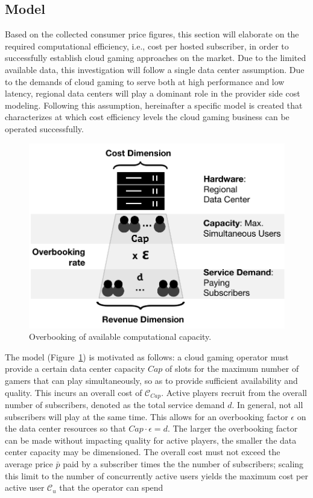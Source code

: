 \subsection{Model}

Based on the collected consumer price figures, this section will elaborate on the required computational efficiency, i.e., cost per hosted subscriber, in order to successfully establish cloud gaming approaches on the market. Due to the limited available data, this investigation will follow a single data center assumption. Due to the demands of cloud gaming to serve both at high performance and low latency, regional data centers will play a dominant role in the provider side cost modeling. Following this assumption, hereinafter a specific model is created that characterizes at which cost efficiency levels the cloud gaming business can be operated successfully.

\begin{figure}[!t]
	\centering
	\includegraphics[width=0.75\columnwidth]{images/overbooking_datacenterNG.pdf}
	\caption{Overbooking of available computational capacity.}
\label{fig:overbooking_datacenter}
\end{figure}

The model (Figure~\ref{fig:overbooking_datacenter}) is motivated as follows: a cloud gaming operator must provide a certain data center capacity $Cap$ of slots for the maximum number of gamers that can play simultaneously, so as to provide sufficient availability and quality. This incurs an overall cost of $\mathcal{C}_{Cap}$. Active players recruit from the overall number of subscribers, denoted as the total service demand $d$. In general, not all subscribers will play at the same time. This allows for an overbooking factor $\epsilon$ on the data center resources so that $Cap \cdot \epsilon = d$. The larger the overbooking factor can be made without impacting quality for active players, the smaller the data center capacity may be dimensioned. %
The overall cost must not exceed the average price $\bar{p}$ paid by a subscriber times the the number of subscribers;
scaling this limit to the number of concurrently active users yields the maximum cost per active user $\mathcal{C}_u$ that the operator can spend

